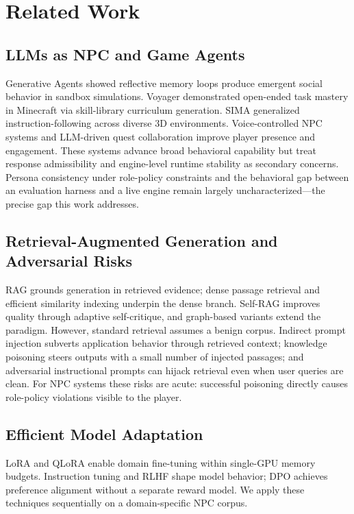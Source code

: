 \documentclass[conference]{IEEEtran}
\begin{document}
\section{Related Work}

\subsection{LLMs as NPC and Game Agents}
Generative Agents \cite{Park2023GenerativeAgents} showed
reflective memory loops produce emergent social behavior in
sandbox simulations. Voyager \cite{Wang2024Voyager} demonstrated
open-ended task mastery in Minecraft via skill-library curriculum
generation. SIMA \cite{DeepMind2024SIMA} generalized
instruction-following across diverse 3D environments.
Voice-controlled NPC systems \cite{Wevelsiep2025Voice} and
LLM-driven quest collaboration \cite{Rao2024Minecraft} improve
player presence and engagement. These systems advance broad
behavioral capability but treat response admissibility and
engine-level runtime stability as secondary concerns. Persona
consistency under role-policy constraints and the behavioral gap
between an evaluation harness and a live engine remain largely
uncharacterized---the precise gap this work addresses.

\subsection{Retrieval-Augmented Generation and Adversarial Risks}
RAG \cite{Lewis2020RAG} grounds generation in retrieved evidence;
dense passage retrieval \cite{Karpukhin2020DPR} and efficient
similarity indexing \cite{Johnson2021FAISS} underpin the dense
branch. Self-RAG \cite{Asai2024SelfRAG} improves quality through
adaptive self-critique, and graph-based variants
\cite{Edge2024GraphRAG} extend the paradigm. However, standard
retrieval assumes a benign corpus. Indirect prompt injection
\cite{Greshake2023PromptInjection} subverts application behavior
through retrieved context; knowledge poisoning
\cite{Zou2025PoisonedRAG} steers outputs with a small number of
injected passages; and adversarial instructional prompts
\cite{Chaturvedi2025AIP} can hijack retrieval even when user
queries are clean. For NPC systems these risks are acute:
successful poisoning directly causes role-policy violations
visible to the player.

\subsection{Efficient Model Adaptation}
LoRA and QLoRA \cite{Hu2021LoRA,Dettmers2023QLoRA} enable
domain fine-tuning within single-GPU memory budgets. Instruction
tuning \cite{Wei2022Flan} and RLHF \cite{Ouyang2022InstructGPT}
shape model behavior; DPO \cite{Rafailov2023DPO} achieves
preference alignment without a separate reward model. We apply
these techniques sequentially on a domain-specific NPC corpus.
\end{document}

